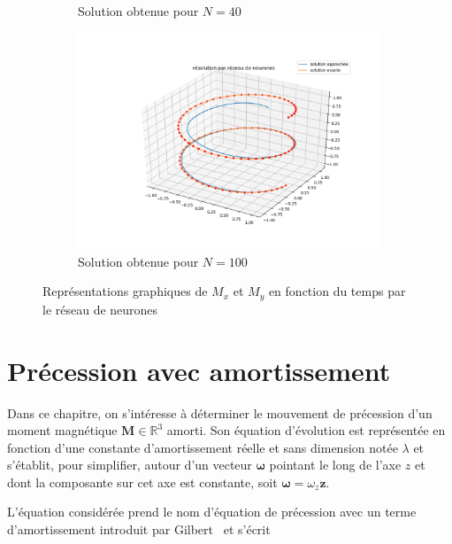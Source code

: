 \documentclass[12pt]{report}
\begin{document}
\begin{figure}
\begin{subfigure}[b]{0.4\textwidth}
        \caption{Solution obtenue pour $N=40$}
    \end{subfigure}
    \hfill
    \begin{subfigure}[b]{0.4\textwidth}
        \centering
        \includegraphics[width=1\textwidth, height=0.9\textwidth]{direct_training_N=100.png}
        \caption{Solution obtenue pour $N=100$}
    \end{subfigure}
    \caption{Représentations graphiques de $M_x$ et  $M_y$ en fonction du temps par le réseau de neurones}
    \label{fig:resultats2NNenfonctiondeN}
\end{figure}


\chapter{Précession avec amortissement}
\label{chap:gilbert}

Dans ce chapitre, on s'intéresse à déterminer le mouvement de précession d'un moment magnétique $\bm{M} \in \mathbb{R}^3$ amorti.
Son équation d'évolution est représentée en fonction d'une constante d'amortissement réelle et sans dimension notée $\lambda$ et s'établit, pour simplifier, autour d'un vecteur ${\bm{\omega}}$ pointant le long de l'axe $z$ et dont la composante sur cet axe est constante, soit $\bm{\omega}=\omega_z{\bm z}$.

L'équation considérée prend le nom d'équation de précession avec un terme d'amortissement introduit par Gilbert~\cite{EquationGilbert} et s'écrit
\end{document}
